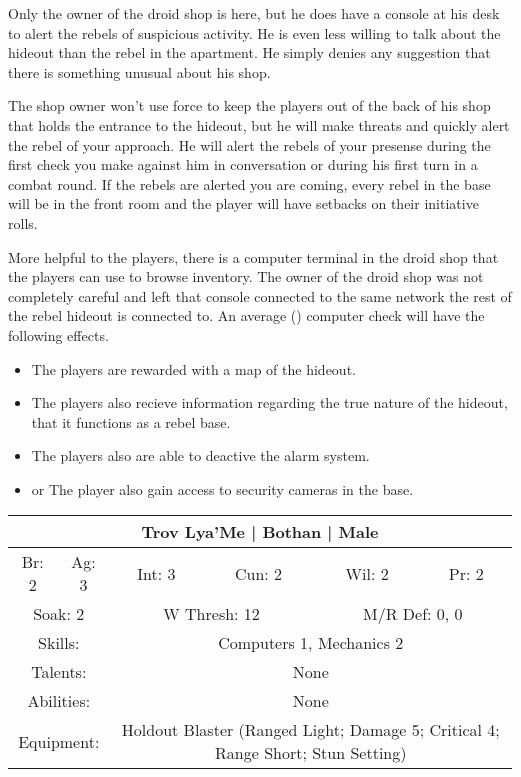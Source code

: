 \documentclass[letterpaper]{article}
\begin{document}
Only the owner of the droid shop is here, but he does have a console at his desk to alert the rebels of suspicious activity. He is even less willing to talk about the hideout than the rebel in the apartment. He simply denies any suggestion that there is something unusual about his shop. 

The shop owner won't use force to keep the players out of the back of his shop that holds the entrance to the hideout, but he will make threats and quickly alert the rebel of your approach. He will alert the rebels of your presense during the first check you make against him in conversation or during his first turn in a combat round. If the rebels are alerted you are coming, every rebel in the base will be in the front room and the player will have setbacks on their initiative rolls.

More helpful to the players, there is a computer terminal in the droid shop that the players can use to browse inventory. The owner of the droid shop was not completely careful and left that console connected to the same network the rest of the rebel hideout is connected to. An average (\difficulty\difficulty) computer check will have the following effects.

\begin{itemize}
    \item \success The players are rewarded with a map of the hideout.
    \item \advantage The players also recieve information regarding the true nature of the hideout, that it functions as a rebel base.
    \item \advantage\advantage The players also are able to deactive the alarm system.
    \item \advantage\advantage\advantage or \triumph The player also gain access to security cameras in the base.
\end{itemize}

\begin{center}
\begin{tabular}{| c c c c c c |}
    \hline
    \multicolumn{6}{|c|}{Trov Lya'Me | Bothan | Male} \\
    \hline
    Br: 2 & Ag: 3 & Int: 3 & Cun: 2 & Wil: 2 & Pr: 2 \\[2mm]
    \multicolumn{2}{|c}{Soak: 2} & \multicolumn{2}{c}{W Thresh: 12} & \multicolumn{2}{c|}{M/R Def: 0, 0} \\
    \hline
    \multicolumn{2}{|c}{Skills:} & \multicolumn{4}{p{5cm}|}{Computers 1, Mechanics 2} \\
    \multicolumn{2}{|c}{Talents:} & \multicolumn{4}{p{5cm}|}{None} \\
    \multicolumn{2}{|c}{Abilities:} & \multicolumn{4}{p{5cm}|}{None} \\
    \multicolumn{2}{|c}{Equipment:} & \multicolumn{4}{p{5cm}|}{Holdout Blaster (Ranged Light; Damage 5; Critical 4; Range Short; Stun Setting)} \\
    \hline
\end{tabular}
\end{center}
\end{document}
